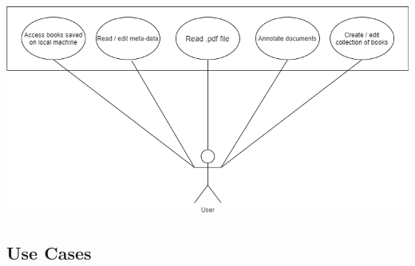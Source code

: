 \documentclass[answers]{exam}
\begin{document}
\paragraph{} \centering
\includegraphics[scale=0.6]{images/User_diag.png}

\newpage
    
\paragraph{} \flushleft
\subsection{Use Cases}
\end{document}
